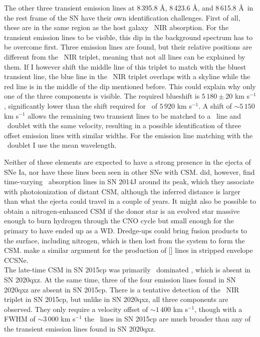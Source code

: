 \documentclass[a4paper,oneside,12pt, class=Latex/Classes/PhDthesisPSnPDF, crop=false]{standalone}
\begin{document}
The other three transient emission lines at 8\,395.8 \AA, 8\,423.6 \AA, and 8\,615.8 \AA\ in the rest frame of the SN have their own identification challenges. First of all, these are in the same region as the host galaxy \CaII\ NIR absorption. For the transient emission lines to be visible, this dip in the background spectrum has to be overcome first. Three emission lines are found, but their relative positions are different from the \CaII\ NIR triplet, meaning that not all lines can be explained by them. If I however shift the middle line of this triplet to match with the bluest transient line, the blue line in the \CaII\ NIR triplet overlaps with a skyline while the red line is in the middle of the dip mentioned before. This could explain why only one of the three components is visible. The required blueshift is $5\,180\pm20$ km s$^{-1}$, significantly lower than the shift required for \Hbeta\ of $5\,920$ km s$^{-1}$. A shift of $\sim5\,150$ km s$^{-1}$ allows the remaining two transient lines to be matched to a \NI\ line and \KI\ doublet with the same velocity, resulting in a possible identification of three offset emission lines with similar widths. For the emission line matching with the \KI\ doublet I use the mean wavelength.

Neither of these elements are expected to have a strong presence in the ejecta of SNe Ia, nor have these lines been seen in other SNe with CSM. \citet{2014J_KI} did, however, find time-varying \KI\ absorption lines in SN 2014J around its peak, which they associate with photoionization of distant CSM, although the inferred distance is larger than what the ejecta could travel in a couple of years. It might also be possible to obtain a nitrogen-enhanced CSM if the donor star is an evolved star massive enough to burn hydrogen through the CNO cycle but small enough for the primary to have ended up as a WD. Dredge-ups could bring fusion products to the surface, including nitrogen, which is then lost from the system to form the CSM. \citet{N_lines_SECCSN} make a similar argument for the production of [\NII] lines in stripped envelope CCSNe.\\

The late-time CSM in SN 2015cp was primarily \Halpha\ dominated \citep{2015cp}, which is absent in SN 2020qxz. At the same time, three of the four emission lines found in SN 2020qxz are absent in SN 2015cp. There is a tentative detection of the \CaII\ NIR triplet in SN 2015cp, but unlike in SN 2020qxz, all three components are observed. They only require a velocity offset of $\sim1\,400$ km s$^{-1}$, though with a FWHM of $\sim3\,000$ km s$^{-1}$ the \CaII\ lines in SN 2015cp are much broader than any of the transient emission lines found in SN 2020qxz.
\end{document}
